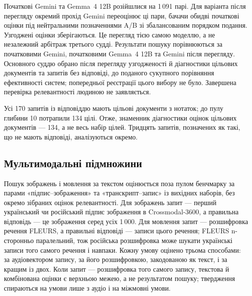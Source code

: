 Початкові Gemini та Gemma~4 12B розійшлися на 1\,091 парі. Для варіанта після перегляду окремий прохід Gemini переоцінює ці пари, бачачи обидві початкові оцінки під нейтральними позначеннями A/B зі збалансованим порядком подання. Узгоджені оцінки зберігаються. Це перегляд тією самою моделлю, а не незалежний арбітраж третього судді. Результати пошуку порівнюються за початковими Gemini, початковими Gemma~4 12B та Gemini після перегляду. Основного суддю обрано після перегляду узгодженості й діагностики цільових документів та запитів без відповіді, до поданого сукупного порівняння ефективності систем; попередньої реєстрації цього вибору не було. Завершена перевірка релевантності людиною не заявляється.

Усі 170 запитів із відповіддю мають цільові документи з нотаток; до пулу глибини 10 потрапили 134 цілі. Отже, знаменник діагностики оцінок цільових документів — 134, а не весь набір цілей. Тридцять запитів, позначених як такі, що не мають відповіді, аналізуються окремо.

\subsection{Мультимодальні підмножини}
Пошук зображень і мовлення за текстом оцінюється поза пулом бенчмарку за парами «підпис--зображення» та «транскрипт--запис» із вихідних наборів, без окремо зібраних оцінок релевантності. Для зображень запит --- перший український чи російський підпис зображення в Crossmodal-3600, а правильна відповідь --- це зображення серед усіх 1\,000. Для мовлення запит --- розшифровка речення FLEURS, а правильні відповіді --- записи цього речення; FLEURS n-сторонньо паралельний, тож російська розшифровка може шукати українські записи того самого речення і навпаки. Кожну умову оцінено трьома способами: за аудіовектором запису, за його розшифровкою, закодованою як текст, і за кращим із двох. Коли запит --- розшифровка того самого запису, текстова й комбінована оцінки є верхньою межею, а не результатом пошуку; твердження спираються на умови лише з аудіо і на міжмовні умови.
